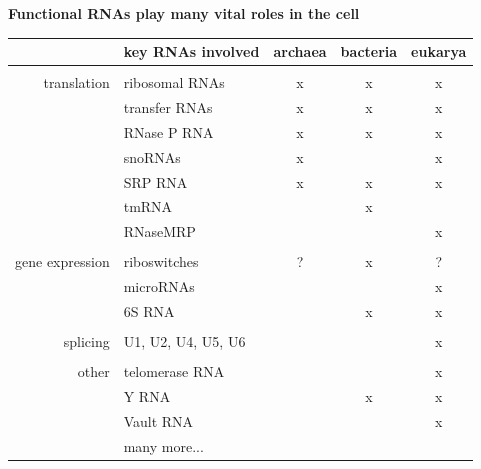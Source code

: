 \documentclass[landscape]{slides}
\begin{document}
\begin{slide}
\begin{center}
\textbf{Functional RNAs play many vital roles in the cell}
\end{center}
\medskip

\small
\begin{center}
\begin{tabular}{r|l|ccc}
 & key RNAs involved & archaea & bacteria & eukarya \\ \hline
 & \\ 
translation & ribosomal RNAs & x & x & x \\
            & transfer RNAs  & x & x & x \\
            & RNase P RNA    & x & x & x \\
            & snoRNAs        & x &   & x \\ 
            & SRP RNA        & x & x & x \\ 
            & tmRNA          &   & x &   \\ 
            & RNaseMRP       &   &   & x \\ 
            &  \\ 
gene expression & riboswitches & ? & x & ? \\
                & microRNAs &  & & x \\
                & 6S RNA & & x & x\\ 
                & \\ 
splicing        & U1, U2, U4, U5, U6 & & & x \\ 
                & \\
other           & telomerase RNA & & & x \\ 
                & Y RNA          & & x & x \\
                & Vault RNA      & & & x \\
                & many more... & & & \\ 
\end{tabular}
\end{center}

\vfill
\end{slide}
\end{document}
